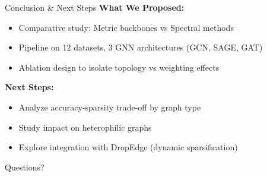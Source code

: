 \documentclass[aspectratio=169]{beamer}
\begin{document}
\begin{frame}{\faFlagCheckered \quad Conclusion \& Next Steps}
    \textbf{\textcolor{cyanneon}{\faCheckCircle \quad What We Proposed:}}
    \begin{itemize}\setlength{\itemsep}{1pt}
        \item Comparative study: Metric backbones vs Spectral methods
        \item Pipeline on 12 datasets, 3 GNN architectures (GCN, SAGE, GAT)
        \item Ablation design to isolate topology vs weighting effects
    \end{itemize}
    
    \vspace{0.15cm}
    \textbf{\textcolor{violetelectric}{\faRocket \quad Next Steps:}}
    \begin{itemize}\setlength{\itemsep}{1pt}
        \item Analyze accuracy-sparsity trade-off by graph type
        \item Study impact on heterophilic graphs
        \item Explore integration with DropEdge (dynamic sparsification)
    \end{itemize}
    
    \vspace{0.2cm}
    \begin{center}
        \Large\textcolor{cyanneon}{\faQuestionCircle \quad Questions?}
    \end{center}
\end{frame}
\end{document}
